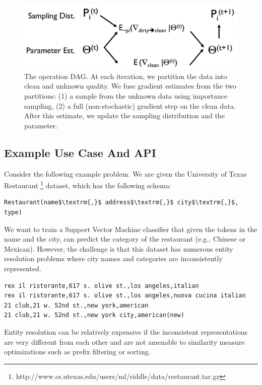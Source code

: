 \begin{figure}[t]
\centering
 \includegraphics[width=\columnwidth]{figs/cmldag.pdf}
 \caption{The \sysfull operation DAG. At each iteration, we partition the data into clean and unknown quality. We fuse gradient estimates from the two partitions: (1) a sample from the unknown data using importance sampling, (2) a full (non-stochastic) gradient step on the clean data. After this estimate, we update the sampling distribution and the parameter.   \label{param-arch}}
\end{figure}



\subsection{Example Use Case And API}\label{api}
Consider the following example problem.
We are given the University of Texas Restaurant \footnote{http://www.cs.utexas.edu/users/ml/riddle/data/restaurant.tar.gz} dataset, which has the following schema:
\begin{lstlisting}[mathescape,basicstyle={\scriptsize}]
Restaurant(name$\textrm{,}$ address$\textrm{,}$ city$\textrm{,}$, type)
\end{lstlisting}
We want to train a Support Vector Machine classifier that given the tokens in the name and the city, can predict the category of the restaurant (e.g., Chinese or Mexican).
However, the challenge is that this dataset has numerous entity resolution problems where city names and categories are inconsistently represented.
\begin{lstlisting}[mathescape,basicstyle={\scriptsize}]
rex il ristorante,617 s. olive st.,los angeles,italian
rex il ristorante,617 s. olive st.,los angeles,nuova cucina italian
21 club,21 w. 52nd st.,new york,american
21 club,21 w. 52nd st.,new york city,american(new)
\end{lstlisting}
Entity resolution can be relatively expensive if the inconsistent representations are very different from each other and are not amenable to similarity measure optimizations such as prefix filtering or sorting.

